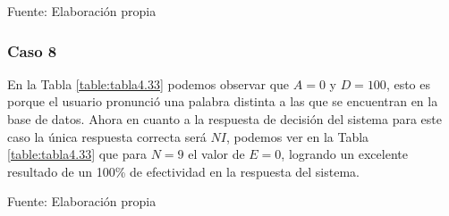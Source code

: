 \begin{center}
\begin{table}[H]
\centering
\caption{\small{Resultados para el caso 7 con U1 estático.}}
\label{table:tabla4.32}
\vskip 0.2cm
\begin{center}
\vskip 0.2cm
{\small{Fuente: Elaboración propia}}
\end{center}
\end{table}
\end{center}

\subsubsection{Caso 8}
En la Tabla \ref{table:tabla4.33} podemos observar que $A = 0$ y $D = 100$, esto es porque el usuario pronunció una palabra distinta a las que se encuentran en la base de datos.
\vskip 0.5cm
Ahora en cuanto a la respuesta de decisión del sistema para este caso la única respuesta correcta será $NI$, podemos ver en la Tabla \ref{table:tabla4.33} que para $N = 9$ el valor de $E = 0$, logrando un excelente resultado de un 100\% de efectividad en la respuesta del sistema.

\begin{center}
\begin{table}[H]
\centering
\caption{\small{Resultados para el caso 8 con U1 estático.}}
\label{table:tabla4.33}
\vskip 0.2cm
\begin{center}
\vskip 0.2cm
{\small{Fuente: Elaboración propia}}
\end{center}
\end{table}
\end{center}

